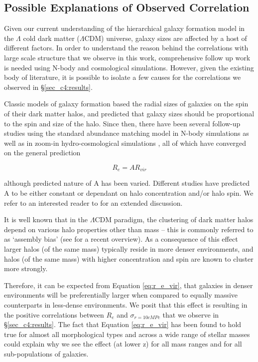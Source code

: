 \subsection{Possible Explanations of Observed Correlation} \label{sec_c4:theory}
Given our current understanding of the hierarchical galaxy formation model in the $\Lambda$ cold dark matter ($\Lambda$CDM) universe, galaxy sizes are affected by a host of different factors. In order to understand the reason behind the correlations with large scale structure that we observe in this work, comprehensive follow up work is needed using N-body and cosmological simulations. However, given the existing body of literature, it is possible to isolate a few causes for the correlations we observed in \S \ref{sec_c4:results}.

Classic models of galaxy formation \citep{fall80,mo98} based the radial sizes of galaxies on the spin of their dark matter halos, and predicted that galaxy sizes should be proportional to the spin and size of the halo. Since then, there have been several follow-up studies using the standard abundance matching model in N-body simulations as well as in zoom-in hydro-cosmological simulations \citep[e.g.,][]{Kravtsov13, somerville18, jiang19}, all of which have converged on the general prediction

\begin{equation}
    R_e = A R_{vir}
    \label{eq:r_e_vir}
\end{equation}

although predicted nature of A has been varied. Different studies have predicted A to be either constant or dependant on halo concentration and/or halo spin. We refer to an interested reader to \citet{wechsler_tinker} for an extended discussion.

It is well known that in the $\Lambda$CDM paradigm, the clustering of dark matter halos depend on various halo properties other than mass \citep[e.g.,][]{wechsler02,wechsler06,gao07} -- this is commonly referred to as `assembly bias' (see \citet{mao18} for a recent overview). As a consequence of this effect larger halos (of the same mass) typically reside in more denser environments, and  halos (of the same mass) with higher concentration and spin are known to cluster more strongly. 

Therefore, it can be expected from Equation \ref{eq:r_e_vir}, that galaxies in denser environments will be preferentially larger when compared to equally massive counterparts in less-dense environments. We posit that this effect is resulting in the positive correlations between $R_e$ and $\sigma_{r=10cMPc}$ that we observe in \S \ref{sec_c4:results}. The fact that Equation \ref{eq:r_e_vir} has been found to hold true for almost all morphological types and across a wide range of stellar masses \cite[e.g.,][]{Kravtsov13} could explain why we see the effect (at lower z) for all mass ranges and for all sub-populations of galaxies. 

